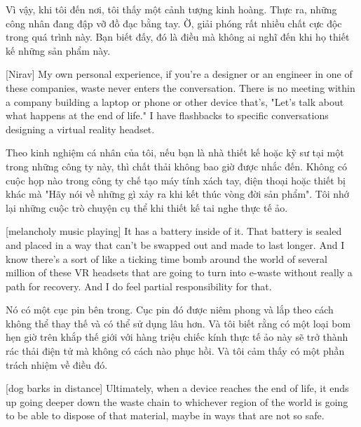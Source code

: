 \documentclass[a4paper]{article}
\begin{document}
	\begin{vietnamese-v2}
		Vì vậy, khi tôi đến nơi, tôi thấy một cảnh tượng kinh hoàng.
		Thực ra, những công nhân đang đập vỡ đồ đạc bằng tay.
		Ờ, giải phóng rất nhiều chất cực độc trong quá trình này.
		Bạn biết đấy, đó là điều mà không ai nghĩ đến khi họ thiết kế những sản phẩm này.
	\end{vietnamese-v2}
	
	[Nirav] My own personal experience, if you're a designer or an engineer in one of these companies, waste never enters the conversation.
	There is no meeting within a company building a laptop or phone or other device that's, "Let's talk about what happens at the end of life."
	I have flashbacks to specific conversations designing a virtual reality headset.
	
	
	\begin{vietnamese-v2}
		[Nirav] Theo kinh nghiệm cá nhân của tôi, nếu bạn là nhà thiết kế hoặc kỹ sư tại một trong những công ty này, thì chất thải không bao giờ được nhắc đến.
		Không có cuộc họp nào trong công ty chế tạo máy tính xách tay, điện thoại hoặc thiết bị khác mà "Hãy nói về những gì xảy ra khi kết thúc vòng đời sản phẩm".
		Tôi nhớ lại những cuộc trò chuyện cụ thể khi thiết kế tai nghe thực tế ảo.
	\end{vietnamese-v2}
	
	[melancholy music playing]
	It has a battery inside of it.
	That battery is sealed and placed in a way that can't be swapped out and made to last longer.
	And I know there's a sort of like a ticking time bomb around the world of several million of these VR headsets that are going to turn into e-waste without really a path for recovery.
	And I do feel partial responsibility for that.
	
	\begin{vietnamese-v2}
		Nó có một cục pin bên trong.
		Cục pin đó được niêm phong và lắp theo cách không thể thay thế và có thể sử dụng lâu hơn.
		Và tôi biết rằng có một loại bom hẹn giờ trên khắp thế giới với hàng triệu chiếc kính thực tế ảo này sẽ trở thành rác thải điện tử mà không có cách nào phục hồi.
		Và tôi cảm thấy có một phần trách nhiệm về điều đó.
	\end{vietnamese-v2}
	
	[dog barks in distance]
	Ultimately, when a device reaches the end of life, it ends up going deeper down the waste chain to whichever region of the world is going to be able to dispose of that material, maybe in ways that are not so safe.
	
\end{document}
